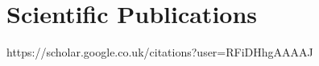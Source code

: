 \documentclass[11pt,a4paper,sans]{moderncv}   %
\begin{document}
\renewcommand{\listitemsymbol}{-~}            %

%
\section{Scientific Publications}
https://scholar.google.co.uk/citations?user=RFiDHhgAAAAJ


\end{document}
